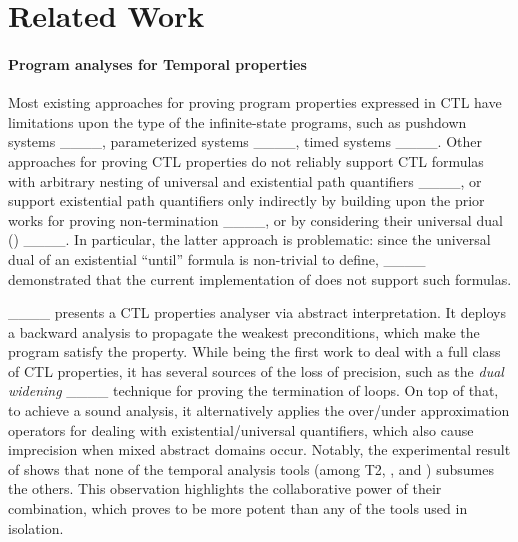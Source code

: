 \section{Related Work}
\label{related_work}




\vspace{-2mm}
\noindent\paragraph{\textbf{Program analyses for Temporal properties}} 

Most existing approaches for proving
program properties expressed in CTL have limitations upon the type of the infinite-state programs, such as pushdown systems ____, parameterized
systems ____, timed systems ____. 
Other approaches for proving CTL properties do not reliably support CTL formulas with arbitrary nesting of universal and existential path quantifiers ____, 
or support existential path quantifiers only indirectly by building upon the prior works 
for proving non-termination ____, or by considering their universal dual (\terminator) ____. In particular, the latter approach is problematic: since the universal dual of an existential ``until'' formula is non-trivial to define, ____ demonstrated that the current implementation of \terminator does not support such formulas. 

\function____ presents a CTL properties analyser via abstract interpretation. It deploys a backward analysis to propagate the weakest preconditions, which make the program satisfy the property. While being the first work to deal with a full class of CTL properties, it has several sources of the loss of precision, such as the \emph{dual widening} ____ technique for proving the termination of loops. On top of that, to achieve a sound analysis, it alternatively applies the over/under approximation operators for dealing with existential/universal quantifiers, which also cause imprecision when mixed abstract domains occur. 
Notably, the experimental result of \function shows that none of the temporal analysis tools (among T2, \ultimate, and \function) subsumes the others. 
This observation highlights the collaborative power of their combination, which proves to be more potent than any of the tools used in isolation. 



